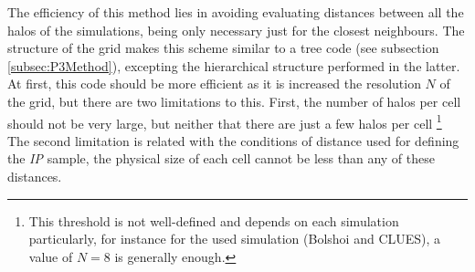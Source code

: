 The efficiency of this method lies in avoiding evaluating distances between
all the halos of the simulations, being only necessary just for the closest
neighbours. The structure of the grid makes this scheme similar to a tree 
code (see subsection \ref{subsec:P3Method}), excepting the hierarchical
structure performed in the latter. At first, this code should be more 
efficient as it is increased the resolution $N$ of the grid, but there are
two limitations to this. First, the number of halos per cell should not
be very large, but neither that there are just a few halos per cell
\footnote{This threshold is not well-defined and depends on each simulation
particularly, for instance for the used simulation (Bolshoi and CLUES), a
value of $N=8$ is generally enough.} The second limitation is related with
the conditions of distance used for defining the \textit{IP} sample, the
physical size of each cell cannot be less than any of these distances.



